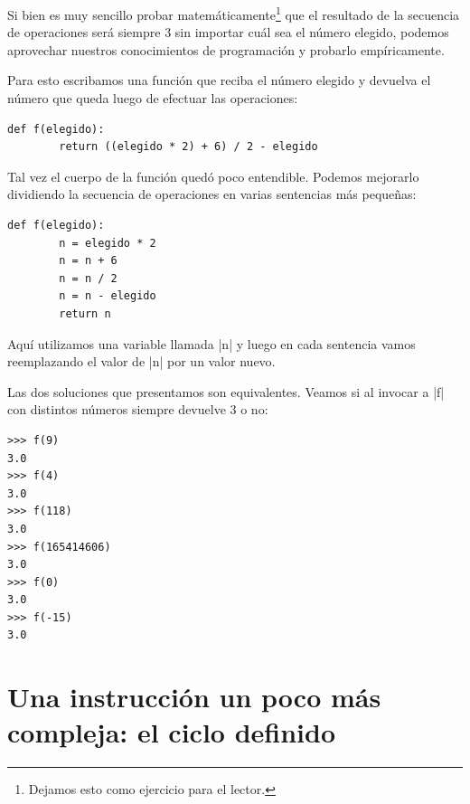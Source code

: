 \begin{solucion}
Si bien es muy sencillo probar matemáticamente\footnote{Dejamos esto como
ejercicio para el lector.} que el resultado de la secuencia de operaciones será
siempre 3 sin importar cuál sea el número elegido, podemos aprovechar nuestros
conocimientos de programación y probarlo empíricamente.

Para esto escribamos una función que reciba el número elegido y devuelva el
número que queda luego de efectuar las operaciones:

\begin{lstlisting}[numbers=none]
def f(elegido):
        return ((elegido * 2) + 6) / 2 - elegido
\end{lstlisting}

Tal vez el cuerpo de la función quedó poco entendible. Podemos mejorarlo
dividiendo la secuencia de operaciones en varias sentencias más pequeñas:

\begin{lstlisting}[numbers=none]
def f(elegido):
        n = elegido * 2
        n = n + 6
        n = n / 2
        n = n - elegido
        return n
\end{lstlisting}

Aquí utilizamos una variable llamada |n| y luego en cada sentencia vamos
reemplazando el valor de |n| por un valor nuevo.

Las dos soluciones que presentamos son equivalentes. Veamos si al invocar a |f|
con distintos números siempre devuelve 3 o no:

\begin{lstlisting}[numbers=none]
>>> f(9)
3.0
>>> f(4)
3.0
>>> f(118)
3.0
>>> f(165414606)
3.0
>>> f(0)
3.0
>>> f(-15)
3.0
\end{lstlisting}
\end{solucion}

\section{Una instrucción un poco más compleja: el ciclo definido}

